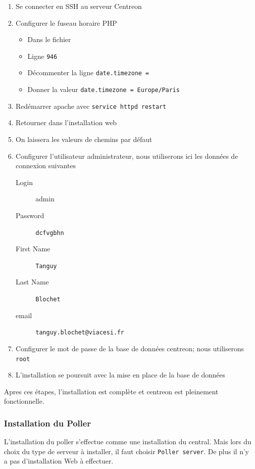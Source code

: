 	\begin{enumerate}
		\item Se connecter en SSH au serveur Centreon
		\item Configurer le fuseau horaire PHP
		\begin{itemize}
			\item Dans le fichier 
			\item Ligne \texttt{946}
			\item Décommenter la ligne \texttt{date.timezone = }
			\item Donner la valeur \texttt{date.timezone = Europe/Paris}
		\end{itemize}
		\item Redémarrer apache avec \texttt{service httpd restart}
		\item Retourner dans l'installation web
		\item On laissera les valeurs de chemins par défaut
		\item Configurer l'utilisateur administrateur, nous utiliserons ici les données de connexion suivantes
		\begin{description}
			\item[Login] admin
			\item[Password] \texttt{dcfvgbhn}
			\item[First Name] \texttt{Tanguy}
			\item[Last Name] \texttt{Blochet}
			\item[email] \texttt{tanguy.blochet@viacesi.fr}
		\end{description}
		\item Configurer le mot de passe de la base de données centreon; nous utiliserons \texttt{root}
		\item L'installation se poursuit avec la mise en place de la base de données
	\end{enumerate}

	Apres ces étapes, l'installation est complète et centreon est pleinement fonctionnelle.

	\subsubsection{Installation du Poller}

	L'installation du poller s'effectue comme une installation du central.
	Mais lors du choix du type de serveur à installer, il faut choisir \texttt{Poller server}.
	De plus il n'y a pas d'installation Web à effectuer.

